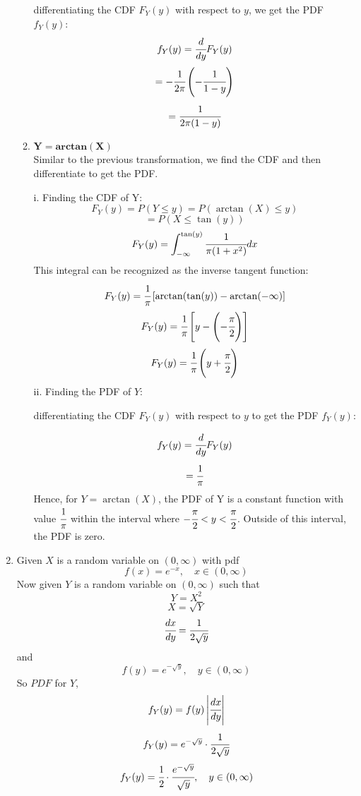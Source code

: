 \documentclass{article}
\begin{document}
\begin{enumerate}
\begin{enumerate}
        differentiating the CDF $F_Y(y)$ with respect to $y$, we get the PDF $f_Y(y)$:
        \[
            f_Y(y) = \cfrac{d}{dy} F_Y(y)
        \]
        \[
            = -\cfrac{1}{2\pi} \left( -\cfrac{1}{1 - y} \right)
        \]
        \[
            = \cfrac{1}{2\pi(1 - y)}
        \]
        \item \( \mathbf{Y = arctan(X)} \)\\
        Similar to the previous transformation, we find the CDF and then differentiate to get the PDF.

        i. Finding the CDF of Y:
        \[ 
            F_Y(y) = P(Y \leq y) = P(\arctan(X) \leq y) 
        \]
        \[ 
            = P(X \leq \tan(y))
        \]
        \[
            F_Y(y) = \int_{-\infty}^{\tan(y)} \cfrac{1}{\pi(1 + x^2)} dx
        \]
        This integral can be recognized as the inverse tangent function:
        \[
            F_Y(y) = \cfrac{1}{\pi} \left[ \arctan(\tan(y)) - \arctan(-\infty) \right]
        \]
        \[
            F_Y(y) = \cfrac{1}{\pi} \left[ y - \left( -\cfrac{\pi}{2} \right) \right]
        \]
        \[
            F_Y(y) = \cfrac{1}{\pi} \left( y + \cfrac{\pi}{2} \right)
        \]
        ii. Finding the PDF of $Y$:

        differentiating the CDF $F_Y(y)$ with respect to $y$ to get the PDF $f_Y(y)$:

        \[
            f_Y(y) = \cfrac{d}{dy} F_Y(y)
        \]
        \[
            = \cfrac{1}{\pi}
        \]
        Hence, for $Y = \arctan(X)$, the PDF of Y is a constant function with value $\cfrac{1}{\pi}$ within the interval where $-\cfrac{\pi}{2} < y < \cfrac{\pi}{2}$. Outside of this interval, the PDF is zero.
        \end{enumerate}

\newpage
\item 
    Given $X$ is a random variable on $(0, \infty)$ with pdf
    \[
        f(x) = e^{-x}, \quad x \in (0, \infty)
    \]
    Now given $Y$ is a random variable on $(0, \infty)$ such that
    \[ 
        Y = X^2
    \]
    \[
        X = \sqrt{Y}
    \]
    \[
        \cfrac{dx}{dy} = \cfrac{1}{2\sqrt{y}}
    \]
    and 
    \[
        f(y) = e^{-\sqrt{y}}, \quad y \in (0, \infty)
    \]
    So \(PDF\) for $Y$,
    \[
        f_Y(y) = f(y) \left|\cfrac{dx}{dy}\right|
    \]
    \[
        f_Y(y) = e^{-\sqrt{y}} \cdot \cfrac{1}{2\sqrt{y}}
    \]
    \[
        f_Y(y) = \cfrac{1}{2} \cdot \cfrac{e^{-\sqrt{y}}}{\sqrt{y}}, \quad y \in (0, \infty)
    \]


\end{enumerate}
\end{document}
